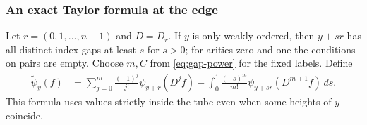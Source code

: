 \subsubsection{An exact Taylor formula at the edge}
Let $r=(0,1,\ldots,n-1)$ and $D=D_r$. If $y$ is only weakly ordered, then
$y+sr$ has all distinct-index gaps at least $s$ for $s>0$; for arities zero
and one the conditions on pairs are empty. Choose $m,C$ from
\eqref{eq:gap-power} for the fixed labels. Define
\begin{align}
 \widetilde\psi_y(f)
 &=\sum_{j=0}^{m}\frac{(-1)^j}{j!}\psi_{y+r}(D^jf)
   -\int_0^1\frac{(-s)^m}{m!}
                    \psi_{y+sr}(D^{m+1}f)\,ds.
                    \label{eq:edge-taylor}
\end{align}
This formula uses values strictly inside the tube even when some heights
of $y$ coincide.

